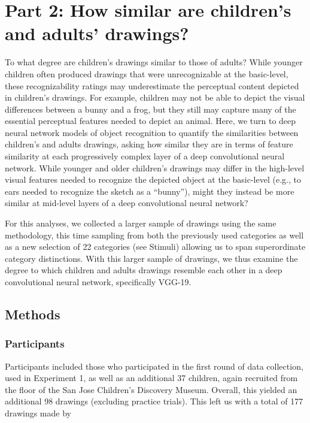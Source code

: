 \documentclass[10pt, letterpaper]{article}
\begin{document}
\section{Part 2: How similar are children's and adults'
drawings?}\label{part-2-how-similar-are-childrens-and-adults-drawings}

To what degree are children's drawings similar to those of adults? While
younger children often produced drawings that were unrecognizable at the
basic-level, these recognizability ratings may underestimate the
perceptual content depicted in children's drawings. For example,
children may not be able to depict the visual differences between a
bunny and a frog, but they still may capture many of the essential
perceptual features needed to depict an animal. Here, we turn to deep
neural network models of object recognition to quantify the similarities
between children's and adults drawings, asking how similar they are in
terms of feature similarity at each progressively complex layer of a
deep convolutional neural network. While younger and older children's
drawings may differ in the high-level visual features needed to
recognize the depicted object at the basic-level (e.g., to ears needed
to recognize the sketch as a ``bunny''), might they instead be more
similar at mid-level layers of a deep convolutional neural network?

For this analyses, we collected a larger sample of drawings using the
same methodology, this time sampling from both the previously used
categories as well as a new selection of 22 categories (see Stimuli)
allowing us to span superordinate category distinctions. With this
larger sample of drawings, we thus examine the degree to which children
and adults drawings resemble each other in a deep convolutional neural
network, specifically VGG-19.

\subsection{Methods}\label{methods-1}

\subsubsection{Participants}\label{participants-1}

Participants included those who participated in the first round of data
collection, used in Experiment 1, as well as an additional 37 children,
again recruited from the floor of the San Jose Children's Discovery
Museum. Overall, this yielded an additional 98 drawings (excluding
practice trials). This left us with a total of 177 drawings made by
\end{document}
